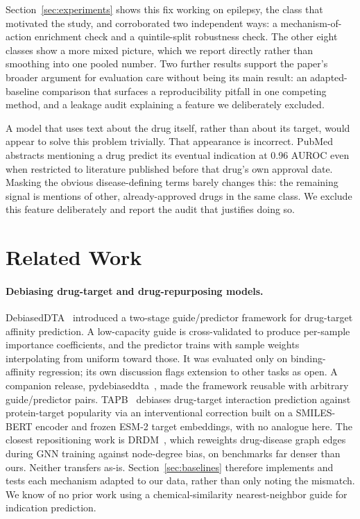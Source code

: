 \documentclass{llncs}
\begin{document}
Section~\ref{sec:experiments} shows this fix working on epilepsy, the class that motivated the study, and corroborated two independent ways: a mechanism-of-action enrichment check and a quintile-split robustness check. The other eight classes show a more mixed picture, which we report directly rather than smoothing into one pooled number. Two further results support the paper's broader argument for evaluation care without being its main result: an adapted-baseline comparison that surfaces a reproducibility pitfall in one competing method, and a leakage audit explaining a feature we deliberately excluded.

A model that uses text about the drug itself, rather than about its target, would appear to solve this problem trivially. That appearance is incorrect. PubMed abstracts mentioning a drug predict its eventual indication at 0.96 AUROC even when restricted to literature published before that drug's own approval date. Masking the obvious disease-defining terms barely changes this: the remaining signal is mentions of other, already-approved drugs in the same class. We exclude this feature deliberately and report the audit that justifies doing so.

\section{Related Work}

\paragraph{Debiasing drug-target and drug-repurposing models.}
DebiasedDTA~\cite{ozcelik2023debiaseddta} introduced a two-stage guide/predictor framework for drug-target affinity prediction. A low-capacity guide is cross-validated to produce per-sample importance coefficients, and the predictor trains with sample weights interpolating from uniform toward those. It was evaluated only on binding-affinity regression; its own discussion flags extension to other tasks as open. A companion release, pydebiaseddta~\cite{barsbey2023pydebiaseddta}, made the framework reusable with arbitrary guide/predictor pairs. TAPB~\cite{tapb2025} debiases drug-target interaction prediction against protein-target popularity via an interventional correction built on a SMILES-BERT encoder and frozen ESM-2 target embeddings, with no analogue here. The closest repositioning work is DRDM~\cite{meng2025drdm}, which reweights drug-disease graph edges during GNN training against node-degree bias, on benchmarks far denser than ours. Neither transfers as-is. Section~\ref{sec:baselines} therefore implements and tests each mechanism adapted to our data, rather than only noting the mismatch. We know of no prior work using a chemical-similarity nearest-neighbor guide for indication prediction.
\end{document}

